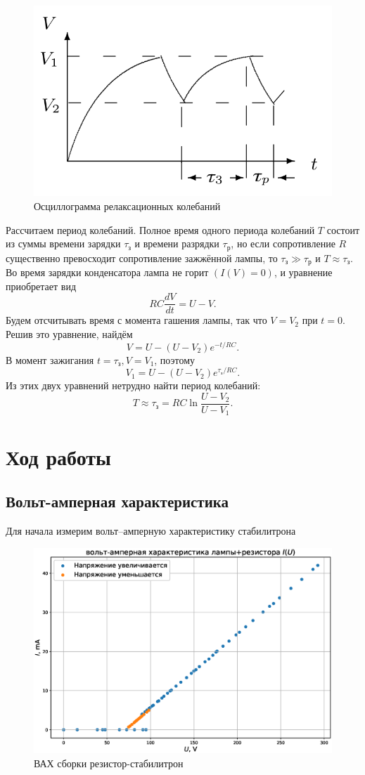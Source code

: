\documentclass{article}
\begin{document}
\begin{figure}[h]
    \center\includegraphics[width = 0.4\linewidth]{kol.png}
    \caption{Осциллограмма релаксационных колебаний}
\end{figure}
Рассчитаем период колебаний. Полное время одного периода колебаний $T$ состоит из суммы
времени зарядки $\tau_\text{з}$ и времени разрядки $\tau_\text{р}$, но если
сопротивление $R$ существенно превосходит сопротивление зажжённой лампы,
то $\tau_\text{з} \gg \tau_\text{р}$ и $T \approx \tau_\text{з}$. Во время зарядки
конденсатора лампа не горит $(I(V) = 0)$, и уравнение приобретает вид
\begin{equation*}
	RC \frac{dV}{dt} = U - V.
\end{equation*}
Будем отсчитывать время с момента гашения лампы, так что $V = V_2$ при $t = 0$. Решив
это уравнение, найдём
\begin{equation*}
	V = U - (U - V_2) e^{-t / RC}.
\end{equation*}
В момент зажигания $t = \tau_\text{з}, V = V_1$, поэтому
\begin{equation*}
	V_1 = U - (U - V_2) e^{\tau_\text{з} / RC}.
\end{equation*}
Из этих двух уравнений нетрудно найти период колебаний:
\begin{equation*}
	T \approx \tau_\text{з} = RC \ln \frac{U - V_2}{U - V_1}.
\end{equation*}

\newpage
\section{Ход работы}
\subsection{Вольт-амперная характеристика}
Для начала измерим вольт--амперную характеристику стабилитрона
\begin{figure}[h]
    \center\includegraphics[width = 0.80\linewidth]{R_IU}
    \caption{ВАХ сборки резистор-стабилитрон}
\end{figure}
\end{document}
